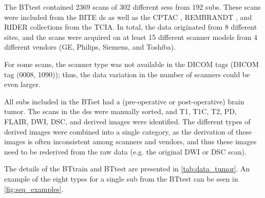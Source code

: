 The \gls{BTtest} contained 2369 \glspl{scan} of 302 different \glspl{ses} from 192 \glspl{sub}.
These \glspl{scan} were included from the \gls{BITE} \gls{ds} \autocite{mercier2012online} as well as the \gls{CPTAC} \autocite*{cptac2018radiology}, \gls{REMBRANDT} \autocite{scarpace2015radiology}, and \gls{RIDER} \autocite{barboriak2015radiology} collections from the \gls{TCIA}.
In total, the data originated from 8 different \glspl{site}, and the \glspl{scan} were acquired on at least 15 different scanner models from 4 different vendors (GE, Philips, Siemens, and Toshiba).

For some \glspl{scan}, the scanner type was not available in the \gls{DICOM} tags (\gls{DICOM} tag (0008, 1090)); thus, the data variation in the number of scanners could be even larger.

All \glspl{sub} included in the \gls{BTset} had a (pre-operative or post-operative) brain tumor.
The \glspl{scan} in the \glspl{ds} were manually sorted, and \gls{T1}, \gls{T1C}, \gls{T2}, \gls{PD}, \gls{FLAIR}, \gls{DWI}, \gls{DSC}, and derived images were identified.
The different types of derived images were combined into a single category, as the derivation of these images is often inconsistent among scanners and vendors, and thus these images need to be rederived from the raw data (e.g. the original \gls{DWI} or \gls{DSC} \gls{scan}).

The details of the \gls{BTtrain} and \gls{BTtest} are presented in \cref{tab:data_tumor}.
An example of the eight \glspl{type} for a single \gls{sub} from the \gls{BTtest} can be seen in \cref{fig:seq_examples}.

